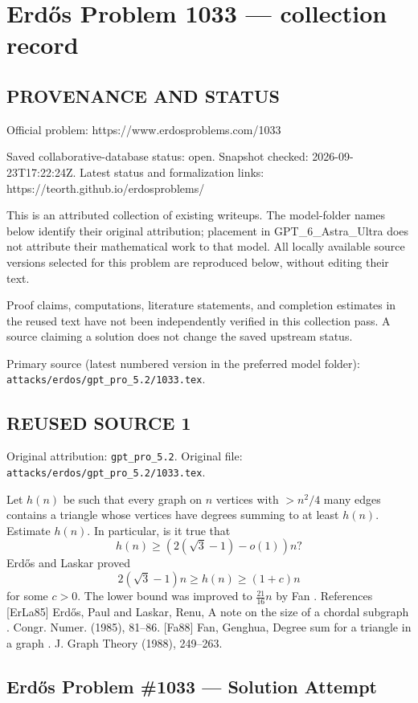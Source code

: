 \section*{Erd\H{o}s Problem 1033 --- collection record}

\subsection*{PROVENANCE AND STATUS}
Official problem: https://www.erdosproblems.com/1033

Saved collaborative-database status: open.
Snapshot checked: 2026-09-23T17:22:24Z.
Latest status and formalization links: https://teorth.github.io/erdosproblems/

This is an attributed collection of existing writeups. The model-folder names below identify their original attribution; placement in GPT\_6\_Astra\_Ultra does not attribute their mathematical work to that model. All locally available source versions selected for this problem are reproduced below, without editing their text.

Proof claims, computations, literature statements, and completion estimates in the reused text have not been independently verified in this collection pass. A source claiming a solution does not change the saved upstream status.

Primary source (latest numbered version in the preferred model folder): \texttt{attacks/erdos/gpt\_pro\_5.2/1033.tex}.

\subsection*{REUSED SOURCE 1}
Original attribution: \texttt{gpt\_pro\_5.2}.
Original file: \texttt{attacks/erdos/gpt\_pro\_5.2/1033.tex}.


Let $h(n)$ be such that every graph on $n$ vertices with $>n^2/4$ many edges contains a triangle whose vertices have degrees summing to at least $h(n)$. Estimate $h(n)$. In particular, is it true that\[h(n)\geq (2(\sqrt{3}-1)-o(1))n?\] Erd\H{o}s and Laskar \cite{ErLa85} proved\[2(\sqrt{3}-1)n \geq h(n) \geq (1+c)n\]for some $c>0$. The lower bound was improved to $\frac{21}{16}n$ by Fan \cite{Fa88}. References [ErLa85] Erd\H{o}s, Paul and Laskar, Renu, A note on the size of a chordal subgraph . Congr. Numer. (1985), 81--86. [Fa88] Fan, Genghua, Degree sum for a triangle in a graph . J. Graph Theory (1988), 249--263.

\subsection*{Erd\H{o}s Problem \#1033 --- Solution Attempt}

